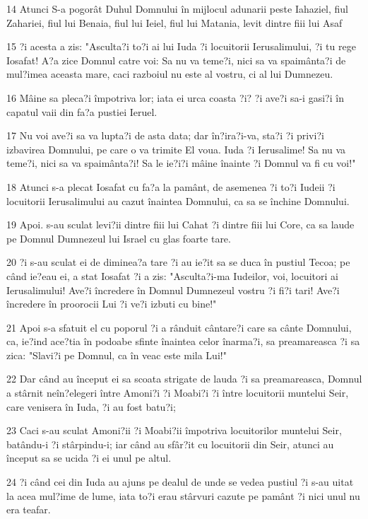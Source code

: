 \par 14 Atunci S-a pogorât Duhul Domnului în mijlocul adunarii peste Iahaziel, fiul Zahariei, fiul lui Benaia, fiul lui Ieiel, fiul lui Matania, levit dintre fiii lui Asaf
\par 15 ?i acesta a zis: "Asculta?i to?i ai lui Iuda ?i locuitorii Ierusalimului, ?i tu rege Iosafat! A?a zice Domnul catre voi: Sa nu va teme?i, nici sa va spaimânta?i de mul?imea aceasta mare, caci razboiul nu este al vostru, ci al lui Dumnezeu.
\par 16 Mâine sa pleca?i împotriva lor; iata ei urca coasta ?i? ?i ave?i sa-i gasi?i în capatul vaii din fa?a pustiei Ieruel.
\par 17 Nu voi ave?i sa va lupta?i de asta data; dar în?ira?i-va, sta?i ?i privi?i izbavirea Domnului, pe care o va trimite El voua. Iuda ?i Ierusalime! Sa nu va teme?i, nici sa va spaimânta?i! Sa le ie?i?i mâine înainte ?i Domnul va fi cu voi!"
\par 18 Atunci s-a plecat Iosafat cu fa?a la pamânt, de asemenea ?i to?i Iudeii ?i locuitorii Ierusalimului au cazut înaintea Domnului, ca sa se închine Domnului.
\par 19 Apoi. s-au sculat levi?ii dintre fiii lui Cahat ?i dintre fiii lui Core, ca sa laude pe Domnul Dumnezeul lui Israel cu glas foarte tare.
\par 20 ?i s-au sculat ei de diminea?a tare ?i au ie?it sa se duca în pustiul Tecoa; pe când ie?eau ei, a stat Iosafat ?i a zis: "Asculta?i-ma Iudeilor, voi, locuitori ai Ierusalimului! Ave?i încredere în Domnul Dumnezeul vostru ?i fi?i tari! Ave?i încredere în proorocii Lui ?i ve?i izbuti cu bine!"
\par 21 Apoi s-a sfatuit el cu poporul ?i a rânduit cântare?i care sa cânte Domnului, ca, ie?ind ace?tia în podoabe sfinte înaintea celor înarma?i, sa preamareasca ?i sa zica: "Slavi?i pe Domnul, ca în veac este mila Lui!"
\par 22 Dar când au început ei sa scoata strigate de lauda ?i sa preamareasca, Domnul a stârnit neîn?elegeri între Amoni?i ?i Moabi?i ?i între locuitorii muntelui Seir, care venisera în Iuda, ?i au fost batu?i;
\par 23 Caci s-au sculat Amoni?ii ?i Moabi?ii împotriva locuitorilor muntelui Seir, batându-i ?i stârpindu-i; iar când au sfâr?it cu locuitorii din Seir, atunci au început sa se ucida ?i ei unul pe altul.
\par 24 ?i când cei din Iuda au ajuns pe dealul de unde se vedea pustiul ?i s-au uitat la acea mul?ime de lume, iata to?i erau stârvuri cazute pe pamânt ?i nici unul nu era teafar.
